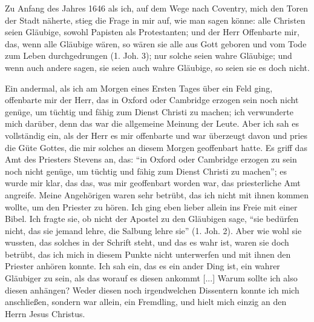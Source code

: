 Zu Anfang des Jahres 1646 als ich, auf dem Wege nach
Coventry, mich den Toren der Stadt näherte, stieg die Frage in
mir auf, wie man sagen könne: alle Christen seien Gläubige, sowohl 
Papisten als Protestanten; und der Herr Offenbarte mir,
das, wenn alle Gläubige wären, so wären sie alle aus Gott 
geboren und vom Tode zum Leben durchgedrungen (1. Joh. 3);
nur solche seien wahre Gläubige; und wenn auch andere sagen,
sie seien auch wahre Gläubige, so seien sie es doch nicht.

Ein andermal, als ich am Morgen eines Ersten Tages über
ein Feld ging, offenbarte mir der Herr, das in Oxford oder 
Cambridge erzogen sein noch nicht genüge, um tüchtig und fähig zum
Dienst Christi zu machen; ich verwunderte mich darüber, denn
das war die allgemeine Meinung der Leute. Aber ich sah es
vollständig ein, als der Herr es mir offenbarte und war überzeugt 
davon und pries die Güte Gottes, die mir solches an diesem
Morgen geoffenbart hatte. Es griff das Amt des Priesters Stevens
an, das: "`in Oxford oder Cambridge erzogen zu sein noch nicht
genüge, um tüchtig und fähig zum Dienst Christi zu machen"'; es
wurde mir klar, das das, was mir geoffenbart worden war, das
priesterliche Amt angreife. Meine Angehörigen waren sehr betrübt,
das ich nicht mit ihnen kommen wollte, um den Priester zu hören.
Ich ging eben lieber allein ins Freie mit einer Bibel. Ich fragte sie,
ob nicht der Apostel zu den Gläubigen sage, "`sie bedürfen nicht, das
sie jemand lehre, die Salbung lehre sie"' (1. Joh. 2). Aber wie wohl 
sie wussten, das solches in der Schrift steht, und das es
wahr ist, waren sie doch betrübt, das ich mich in diesem Punkte
nicht unterwerfen und mit ihnen den Priester anhören konnte.
Ich sah ein, das es ein ander Ding ist, ein wahrer Gläubiger
zu sein, als das worauf es diesen ankommt [...] Warum sollte
ich also diesen anhängen? Weder diesen noch irgendwelchen
Dissentern konnte ich mich anschließen, sondern war allein, ein
Fremdling, und hielt mich einzig an den Herrn Jesus Christus.

